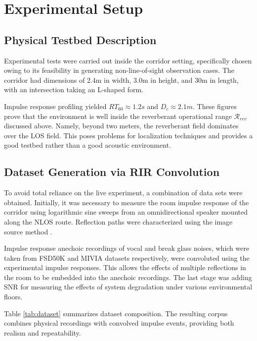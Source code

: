 \documentclass[conference]{IEEEtran}
\begin{document}
\section{Experimental Setup}

\subsection{Physical Testbed Description}
Experimental tests were carried out inside the corridor setting, specifically chosen owing to its feasibility in generating non-line-of-sight observation cases. The corridor had dimensions of 2.4m in width, 3.0m in height, and 30m in length, with an intersection taking an L-shaped form.

Impulse response profiling yielded $RT_{60} \approx 1.2s$ and $D_c \approx 2.1m$. These figures prove that the environment is well inside the reverberant operational range $\mathcal{R}_{rev}$ discussed above. Namely, beyond two meters, the reverberant field dominates over the LOS field. This poses problems for localization techniques and provides a good testbed rather than a good acoustic environment.

\subsection{Dataset Generation via RIR Convolution}
To avoid total reliance on the live experiment, a combination of data sets were obtained. Initially, it was necessary to measure the room impulse response of the corridor using logarithmic sine sweeps from an omnidirectional speaker mounted along the NLOS route. Reflection paths were characterized using the image source method \cite{b30}.

Impulse response anechoic recordings of vocal and break glass noises, which were taken from FSD50K and MIVIA datasets respectively, were convoluted using the experimental impulse responses. This allows the effects of multiple reflections in the room to be embedded into the anechoic recordings. The last stage was adding SNR for measuring the effects of system degradation under various environmental floors.

Table \ref{tab:dataset} summarizes dataset composition. The resulting corpus combines physical recordings with convolved impulse events, providing both realism and repeatability.
\end{document}
